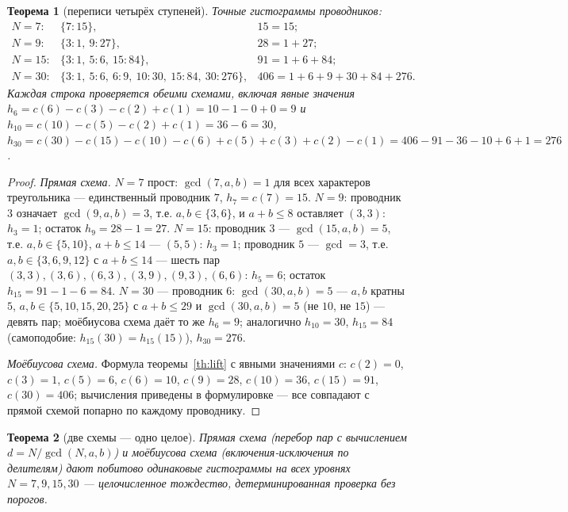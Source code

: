 \documentclass[11pt,a4paper]{article}
\theoremstyle{plain}
\newtheorem{theorem}{Теорема}
\theoremstyle{definition}
\theoremstyle{remark}
\begin{document}
\begin{theorem}[переписи четырёх ступеней]\label{th:four}
Точные гистограммы проводников:
\[
\begin{array}{lll}
N=7: & \{7\colon 15\}, & 15=15;\\[0.15em]
N=9: & \{3\colon 1,\ 9\colon 27\}, & 28=1+27;\\[0.15em]
N=15: & \{3\colon 1,\ 5\colon 6,\ 15\colon 84\}, & 91=1+6+84;\\[0.15em]
N=30: & \{3\colon 1,\ 5\colon 6,\ 6\colon 9,\ 10\colon 30,\ 15\colon 84,\ 30\colon 276\}, & 406=1+6+9+30+84+276.
\end{array}
\]
Каждая строка проверяется обеими схемами, включая явные значения
$h_6=c(6)-c(3)-c(2)+c(1)=10-1-0+0=9$ и
$h_{10}=c(10)-c(5)-c(2)+c(1)=36-6=30$,
$h_{30}=c(30)-c(15)-c(10)-c(6)+c(5)+c(3)+c(2)-c(1)
=406-91-36-10+6+1=276$.
\end{theorem}

\begin{proof}
\emph{Прямая схема.} $N=7$ прост: $\gcd(7,a,b)=1$ для всех
характеров треугольника --- единственный проводник $7$,
$h_7=c(7)=15$. $N=9$: проводник $3$ означает
$\gcd(9,a,b)=3$, т.е. $a,b\in\{3,6\}$, и $a+b\le8$ оставляет
$(3,3)$: $h_3=1$; остаток $h_9=28-1=27$. $N=15$: проводник $3$
--- $\gcd(15,a,b)=5$, т.е. $a,b\in\{5,10\}$, $a+b\le14$ ---
$(5,5)$: $h_3=1$; проводник $5$ --- $\gcd=3$, т.е. $a,b\in\{3,6,9,12\}$
с $a+b\le14$ --- шесть пар $(3,3),(3,6),(6,3),(3,9),(9,3),(6,6)$:
$h_5=6$; остаток $h_{15}=91-1-6=84$. $N=30$ --- проводник $6$: $\gcd(30,a,b)=5$ --- $a,b$ кратны $5$,
$a,b\in\{5,10,15,20,25\}$ с $a+b\le29$ и $\gcd(30,a,b)=5$
(не $10$, не $15$) --- девять пар; моёбиусова схема даёт то же
$h_6=9$; аналогично $h_{10}=30$, $h_{15}=84$ (самоподобие:
$h_{15}(30)=h_{15}(15)$), $h_{30}=276$.

\emph{Моёбиусова схема.} Формула теоремы~\ref{th:lift} с
явными значениями $c$: $c(2)=0$, $c(3)=1$, $c(5)=6$, $c(6)=10$,
$c(9)=28$, $c(10)=36$, $c(15)=91$, $c(30)=406$; вычисления
приведены в формулировке --- все совпадают с прямой схемой
попарно по каждому проводнику.
\end{proof}

\begin{theorem}[две схемы --- одно целое]\label{th:two}
Прямая схема (перебор пар с вычислением $d=N/\gcd(N,a,b)$) и
моёбиусова схема (включения-исключения по делителям) дают
\emph{побитово одинаковые} гистограммы на всех уровнях
$N=7,9,15,30$ --- целочисленное тождество, детерминированная
проверка без порогов.
\end{theorem}
\end{document}
